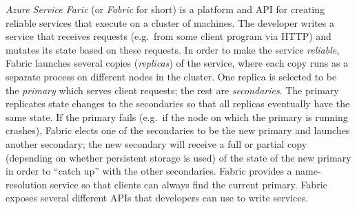 
\emph{Azure Service Faric} (or \emph{Fabric} for short)
is a platform and API for creating reliable services
that execute on a cluster of machines.
The developer writes a service that receives requests (e.g.\ from some client program via HTTP)
and mutates its state based on these requests.
In order to make the service \emph{reliable},
Fabric launches several copies (\emph{replicas}) of the service,
where each copy runs as a separate process
on different nodes in the cluster.
One replica is selected to be the \emph{primary}
which serves client requests; the rest are \emph{secondaries}.
The primary replicates state changes to the secondaries
so that all replicas eventually have the same state.
If the primary fails (e.g.\ if the node on which the primary is running crashes),
Fabric elects one of the secondaries to be the new primary
and launches another secondary;
the new secondary will receive a full or partial copy (depending on whether persistent storage is used) 
of the state of the new primary in order to ``catch up'' with the other secondaries. 
Fabric provides a name-resolution service so that clients can always find the current primary.
Fabric exposes several different APIs that developers can use to write services.
































